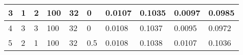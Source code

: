 \begin{table}
{\begin{tabular}{|llllllllll|}
3             & 1                                                               & 2                                                               & 100            & 32                                                             & 0                & 0.0107                                                                    & 0.1035                                                                   & 0.0097                                                               & 0.0985                                                              \\ \hline
4             & 3                                                               & 3                                                               & 100            & 32                                                             & 0                & 0.0108                                                                    & 0.1037                                                                   & 0.0095                                                               & 0.0972                                                              \\ \hline
5             & 2                                                               & 1                                                               & 100            & 32                                                             & 0.5              & 0.0108                                                                    & 0.1038                                                                   & 0.0107                                                               & 0.1036                                                              \\ \hline
\end{tabular}}
\end{table}
